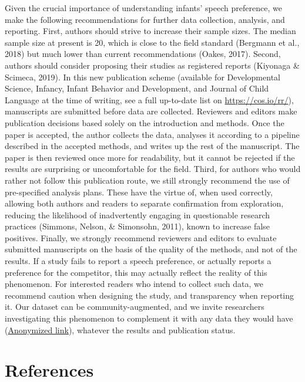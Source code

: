 \documentclass[man,floatsintext]{apa6}
\begin{document}
Given the crucial importance of understanding infants' speech preference, we make the following recommendations for further data collection, analysis, and reporting. First, authors should strive to increase their sample sizes. The median sample size at present is 20, which is close to the field standard (Bergmann et al., 2018) but much lower than current recommendations (Oakes, 2017). Second, authors should consider proposing their studies as registered reports (Kiyonaga \& Scimeca, 2019). In this new publication scheme (available for Developmental Science, Infancy, Infant Behavior and Development, and Journal of Child Language at the time of writing, see a full up-to-date list on \url{https://cos.io/rr/}), manuscripts are submitted before data are collected. Reviewers and editors make publication decisions based solely on the introduction and methods. Once the paper is accepted, the author collects the data, analyses it according to a pipeline described in the accepted methods, and writes up the rest of the manuscript. The paper is then reviewed once more for readability, but it cannot be rejected if the results are surprising or uncomfortable for the field. Third, for authors who would rather not follow this publication route, we still strongly recommend the use of pre-specified analysis plans. These have the virtue of, when used correctly, allowing both authors and readers to separate confirmation from exploration, reducing the likelihood of inadvertently engaging in questionable research practices (Simmons, Nelson, \& Simonsohn, 2011), known to increase false positives. Finally, we strongly recommend reviewers and editors to evaluate submitted manuscripts on the basis of the quality of the methods, and not of the results. If a study fails to report a speech preference, or actually reports a preference for the competitor, this may actually reflect the reality of this phenomenon. For interested readers who intend to collect such data, we recommend caution when designing the study, and transparency when reporting it. Our dataset can be community-augmented, and we invite researchers investigating this phenomenon to complement it with any data they would have (\href{https://osf.io/4stz9/?view_only=d0696591ebf34bfc8430f848cd945ca8}{Anonymized link}), whatever the results and publication status.

\newpage

\hypertarget{references}{%
\section{References}\label{references}}
\end{document}
